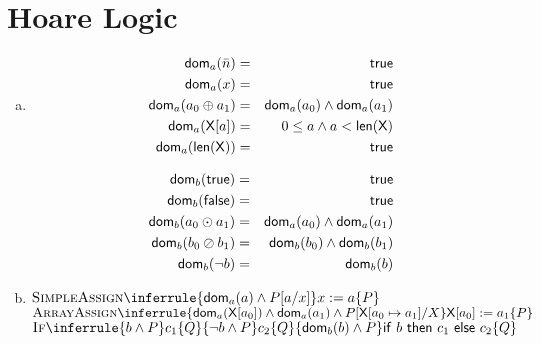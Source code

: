 \section{Hoare Logic}

\newcommand{\true}{\textsf{true}}
\newcommand{\len}[1]{\textsf{len}(#1)}
\newcommand{\dom}{{\sf dom}}
\newcommand{\ifstmt}[3]{{\sf if}~#1~{\sf then}~#2~{\sf else}~#3}
\newcommand{\whilestmt}[2]{{\sf while}~#1~{\sf do}~#2}
\newcommand{\X}{\textsf{X}}

\begin{enumerate}[(a)]
\item \begin{eqnarray*}
    \dom_a(\bar{n})        & = & {\sf true} \\
    \dom_a(x)              & = & {\sf true} \\
    \dom_a(a_0 \oplus a_1) & = & \dom_a(a_0) \wedge \dom_a(a_1) \\
    \dom_a({\sf X}[a])     & = & 0 \leq a \wedge a < {\sf len(X)} \\
    \dom_a({\sf len(X)})   & = & {\sf true} \\
\end{eqnarray*}

\begin{eqnarray*}
    \dom_b({\sf true})      & = & {\sf true} \\
    \dom_b({\sf false})     & = & {\sf true} \\
    \dom_b(a_0 \odot a_1)   & = & \dom_a(a_0) \wedge \dom_a(a_1) \\
    \dom_b(b_0 \oslash b_1) & = & \dom_b(b_0) \wedge \dom_b(b_1) \\
    \dom_b(\neg b)          & = & \dom_b(b) \\
\end{eqnarray*}

\item
$
\Rule{SimpleAssign}{}{
    \{ \dom_a(a) \wedge P[a / x]\}
    x := a
    \{ P \}
}
$
\\

$
\Rule{ArrayAssign}{}{
    \{ \dom_a({\sf X}[a_0]) \wedge \dom_a(a_1) \wedge P[{\sf X}[a_0 \mapsto a_1] / X \}
    {\sf X}[a_0] := a_1
    \{ P \}
}
$
\\

$
\Rule{If}{
    \{ b \wedge P \}
    c_1
    \{ Q \}
    \\
    \{ \neg b \wedge P \}
    c_2
    \{ Q \}
}{
    \{ \dom_b(b) \wedge P \}
    \ifstmt{b}{c_1}{c_2}
    \{ Q \}
}
$
\\


\end{enumerate}
